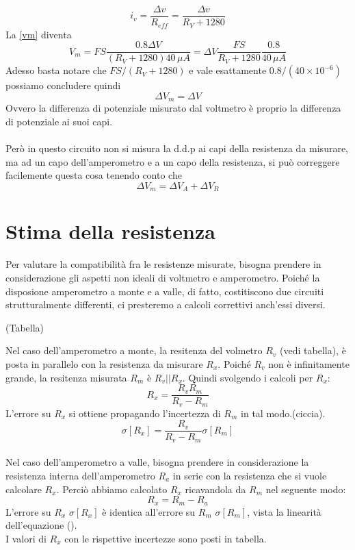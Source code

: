 \documentclass[12pt]{article}
\begin{document}
\begin{equation}
i_v = \frac{\Delta v}{R_{eff}} = \frac{\Delta v}{R_{V}+1280}
\end{equation}
La \eqref{vm} diventa
\begin{equation}
V_m = FS\frac{0.8\Delta V}{(R_V+1280)40\,\mu A} = \Delta V\frac{FS}{R_V+1280}\frac{0.8}{40\,\mu A}
\end{equation}
Adesso basta notare che $FS/ (R_V+1280)$ e vale esattamente $0.8/(40\times 10^{-6})$ possiamo concludere quindi
\begin{equation}
\Delta V_m = \Delta V
\end{equation}
Ovvero la differenza di potenziale misurato dal voltmetro è proprio la differenza di potenziale ai suoi capi.\\
\\Però in questo circuito non si misura la d.d.p ai capi della resistenza da misurare, ma ad un capo dell'amperometro e a un capo della resistenza, si può correggere facilemente questa cosa tenendo conto che
\begin{equation}
\Delta V_m = \Delta V_A + \Delta V_R
\end{equation}
\section{Stima della resistenza}
 Per valutare la compatibilità fra le resistenze misurate, bisogna prendere in considerazione gli aspetti non ideali di voltmetro e amperometro. Poiché la disposione amperometro a monte e a valle, di fatto, costitiscono due circuiti strutturalmente differenti, ci presteremo a calcoli correttivi anch'essi diversi.

(Tabella)

Nel caso dell'amperometro a monte, la resitenza del volmetro $R_v$ (vedi tabella), è posta in parallelo con la resistenza da misurare $R_x$. Poiché $R_v$ non è infinitamente grande, la resitenza misurata $R_m$ è $R_v||R_x$. Quindi svolgendo i calcoli per $R_x$:
\begin{equation}
R_x = \frac{R_v R_m}{R_v - R_m}
\end{equation}
L'errore su $R_x$ si ottiene propagando l'incertezza di $R_m$ in tal modo.(ciccia).
 \begin{equation}
 \sigma [R_x] = \frac{R_v}{R_v-R_m} \sigma [R_m]
\end{equation}
\\
Nel caso dell'amperometro a valle, bisogna prendere in considerazione la resistenza interna dell'amperometro $R_a$ in serie con la resistenza che si vuole calcolare $R_x$. Perciò abbiamo calcolato $R_x$ ricavandola da $R_m$ nel seguente modo:
\begin{equation}
R_x = R_m-R_a
\end{equation}
L'errore su $R_x$ $\sigma [R_x]$ è identica all'errore su $R_m$ $\sigma [R_m]$, vista la linearità dell'equazione ().\\
I valori di $R_x$ con le rispettive incertezze sono posti in tabella.
\end{document}
